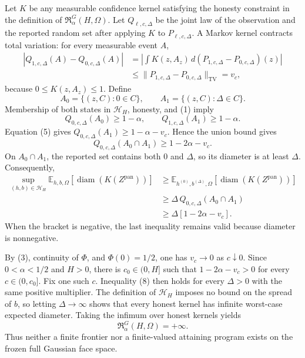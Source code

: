 Let \(K\) be any measurable confidence kernel satisfying the honesty constraint in the definition of \(\mathfrak R_{\alpha}^{G}(H,\Omega)\). Let \(Q_{\ell,c,\Delta}\) be the joint law of the observation and the reported random set after applying \(K\) to \(P_{\ell,c,\Delta}\). A Markov kernel contracts total variation: for every measurable event \(A\),
\[
\begin{aligned}
 |Q_{1,c,\Delta}(A)-Q_{0,c,\Delta}(A)|
 &=\left|\int K(z,A_z)\,d(P_{1,c,\Delta}-P_{0,c,\Delta})(z)\right|\\
 &\leq \lVert P_{1,c,\Delta}-P_{0,c,\Delta}\rVert_{\mathrm{TV}}
 =v_c,
\end{aligned}
\tag{5}
\]
because \(0\leq K(z,A_z)\leq1\). Define
\[
 A_0=\{(z,C):0\in C\},
 \qquad
 A_1=\{(z,C):\Delta\in C\}.
\]
Membership of both states in \(\mathcal H_H\), honesty, and (1) imply
\[
 Q_{0,c,\Delta}(A_0)\geq1-\alpha,
 \qquad
 Q_{1,c,\Delta}(A_1)\geq1-\alpha.
 \tag{6}
\]
Equation (5) gives \(Q_{0,c,\Delta}(A_1)\geq1-\alpha-v_c\). Hence the union bound gives
\[
 Q_{0,c,\Delta}(A_0\cap A_1)
 \geq1-2\alpha-v_c.
 \tag{7}
\]
On \(A_0\cap A_1\), the reported set contains both \(0\) and \(\Delta\), so its diameter is at least \(\Delta\). Consequently,
\[
\begin{aligned}
 \sup_{(h,b)\in\mathcal H_H}
 \mathbb E_{h,b,\Omega}[\operatorname{diam}(K(Z^{\mathrm{pan}}))]
 &\geq
 \mathbb E_{h^{(0)},b^{(\Delta)},\Omega}
 [\operatorname{diam}(K(Z^{\mathrm{pan}}))]\\
 &\geq \Delta\,Q_{0,c,\Delta}(A_0\cap A_1)\\
 &\geq \Delta[1-2\alpha-v_c].
\end{aligned}
\tag{8}
\]
When the bracket is negative, the last inequality remains valid because diameter is nonnegative.

By (3), continuity of \(\Phi\), and \(\Phi(0)=1/2\), one has \(v_c\to0\) as \(c\downarrow0\). Since \(0<\alpha<1/2\) and \(H>0\), there is \(c_0\in(0,H]\) such that \(1-2\alpha-v_c>0\) for every \(c\in(0,c_0]\). Fix one such \(c\). Inequality (8) then holds for every \(\Delta>0\) with the same positive multiplier. The definition of \(\mathcal H_H\) imposes no bound on the spread of \(b\), so letting \(\Delta\to\infty\) shows that every honest kernel has infinite worst-case expected diameter. Taking the infimum over honest kernels yields
\[
 \mathfrak R_{\alpha}^{G}(H,\Omega)=+\infty.
\]
Thus neither a finite frontier nor a finite-valued attaining program exists on the frozen full Gaussian face space.

